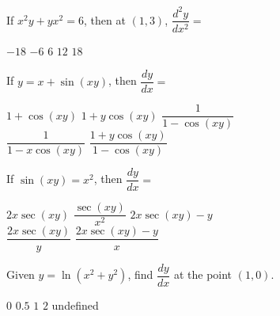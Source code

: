 \begin{questions}
    \question If $x^2y + yx^2 = 6$, then at $(1, 3)$, $\dfrac{d^2y}{dx^2} = $ \\

    \begin{oneparchoices}
        \choice $-18$
        \choice $-6$
        \choice $6$
        \choice $12$
        \choice $18$
    \end{oneparchoices} \par \horizontalline

    \question If $y = x + \sin (xy)$, then $\dfrac{dy}{dx} = $ \\
    
    \begin{oneparchoices}
        \choice $1 + \cos (xy)$
        \choice $1 + y\cos (xy)$
        \choice $\dfrac{1}{1 - \cos (xy)}$ \\[11pt]
        \makebox[0.22\textwidth] \choice $\dfrac{1}{1 - x\cos (xy)}$
        \makebox[0.24\textwidth] \choice $\dfrac{1 + y\cos (xy)}{1 - \cos (xy)}$
    \end{oneparchoices} \par \horizontalline

    \question If $\sin (xy) = x^2$, then $\dfrac{dy}{dx} = $ \\

    \begin{oneparchoices}
        \choice $2x\sec (xy)$
        \choice $\dfrac{\sec (xy)}{x^2}$
        \choice $2x\sec (xy) - y$ \\[11pt]
        \makebox[0.22\textwidth] \choice $\dfrac{2x\sec (xy)}{y}$
        \makebox[0.25\textwidth] \choice $\dfrac{2x\sec (xy) - y}{x}$
    \end{oneparchoices} \par \horizontalline

    \question Given $y = \ln \left(x^2 + y^2\right)$, find $\dfrac{dy}{dx}$ at the point $(1, 0)$. \\

    \begin{oneparchoices}
        \choice $0$
        \choice $0.5$
        \choice $1$
        \choice $2$
        \choice undefined
    \end{oneparchoices} \par \horizontalline
\end{questions} 